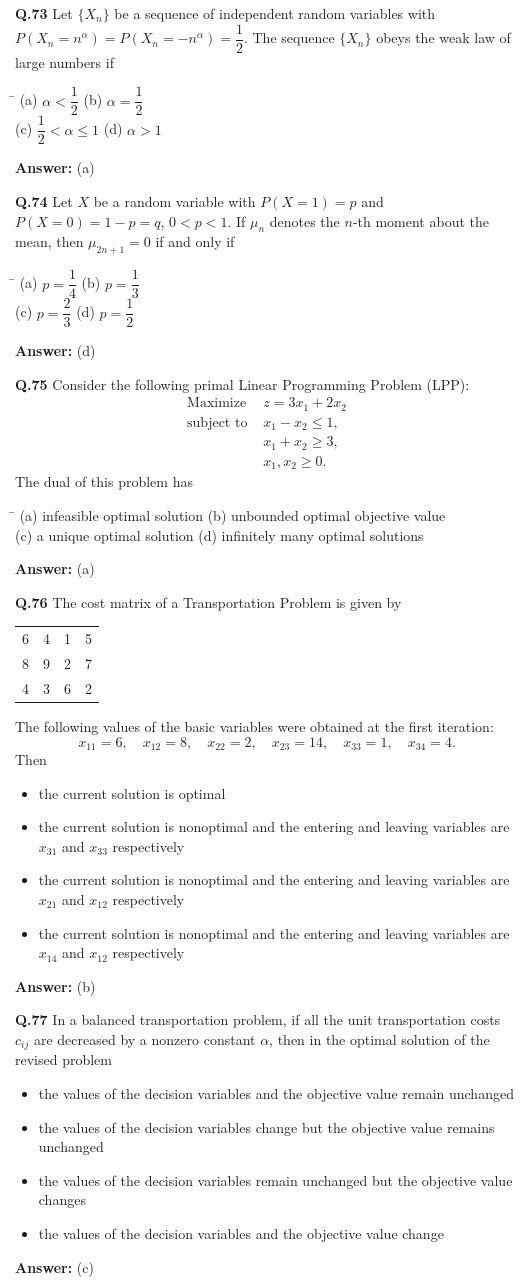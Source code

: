 \documentclass[11pt,a4paper]{article}
\newcommand{\optsfour}[4]{%
  \begin{tabbing}
    \hspace{0.48\linewidth}\=\kill
    (a) #1 \> (b) #2 \\[2pt]
    (c) #3 \> (d) #4
  \end{tabbing}%
}
\newcommand{\optslist}[4]{%
  \begin{itemize}
    \setlength{\itemsep}{2pt}\setlength{\parskip}{0pt}
    \item[(a)] #1
    \item[(b)] #2
    \item[(c)] #3
    \item[(d)] #4
  \end{itemize}%
}
\newcommand{\ans}[1]{\textbf{Answer:} #1\par\medskip}
\begin{document}
\textbf{Q.73} Let $\{X_n\}$ be a sequence of independent random variables with $P(X_n = n^\alpha) = P(X_n = -n^\alpha) = \dfrac{1}{2}$. The sequence $\{X_n\}$ obeys the weak law of large numbers if
\optsfour{$\alpha < \dfrac{1}{2}$}{$\alpha = \dfrac{1}{2}$}{$\dfrac{1}{2} < \alpha \le 1$}{$\alpha > 1$}
\ans{(a)}

\textbf{Q.74} Let $X$ be a random variable with $P(X = 1) = p$ and $P(X = 0) = 1 - p = q$, $0 < p < 1$. If $\mu_n$ denotes the $n$-th moment about the mean, then $\mu_{2n+1} = 0$ if and only if
\optsfour{$p = \dfrac{1}{4}$}{$p = \dfrac{1}{3}$}{$p = \dfrac{2}{3}$}{$p = \dfrac{1}{2}$}
\ans{(d)}

\textbf{Q.75} Consider the following primal Linear Programming Problem (LPP):
\begin{align*}
  \text{Maximize } & z = 3x_1 + 2x_2 \\
  \text{subject to } & x_1 - x_2 \le 1, \\
                     & x_1 + x_2 \ge 3, \\
                     & x_1, x_2 \ge 0.
\end{align*}
The dual of this problem has
\optsfour{infeasible optimal solution}{unbounded optimal objective value}{a unique optimal solution}{infinitely many optimal solutions}
\ans{(a)}

\textbf{Q.76} The cost matrix of a Transportation Problem is given by
\begin{center}
\begin{tabular}{cccc}
  \toprule
  6 & 4 & 1 & 5 \\
  8 & 9 & 2 & 7 \\
  4 & 3 & 6 & 2 \\
  \bottomrule
\end{tabular}
\end{center}
The following values of the basic variables were obtained at the first iteration:
\[
  x_{11} = 6,\quad x_{12} = 8,\quad x_{22} = 2,\quad x_{23} = 14,\quad x_{33} = 1,\quad x_{34} = 4.
\]
Then
\optslist{the current solution is optimal}{the current solution is nonoptimal and the entering and leaving variables are $x_{31}$ and $x_{33}$ respectively}{the current solution is nonoptimal and the entering and leaving variables are $x_{21}$ and $x_{12}$ respectively}{the current solution is nonoptimal and the entering and leaving variables are $x_{14}$ and $x_{12}$ respectively}
\ans{(b)}

\textbf{Q.77} In a balanced transportation problem, if all the unit transportation costs $c_{ij}$ are decreased by a nonzero constant $\alpha$, then in the optimal solution of the revised problem
\optslist{the values of the decision variables and the objective value remain unchanged}{the values of the decision variables change but the objective value remains unchanged}{the values of the decision variables remain unchanged but the objective value changes}{the values of the decision variables and the objective value change}
\ans{(c)}
\end{document}
